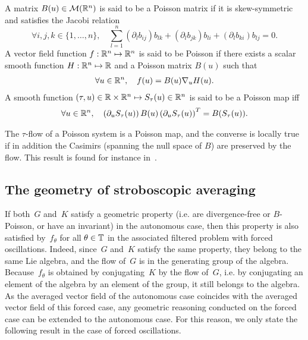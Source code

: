 \begin{definition}
  A matrix $B(u) \in {\cal M}(\mathbb{R}^{n})$ is said to be a Poisson matrix if
  it is skew-symmetric and satisfies the Jacobi relation
  $$
  \forall i,j,k \in \{1,\ldots,n\}, \quad \sum_{l=1}^n (\partial_l b_{ij}) b_{lk} +(\partial_l b_{jk}) b_{li}+(\partial_l b_{ki}) b_{lj} = 0. 
  $$
  A vector field function $f:\mathbb{R}^{n} \mapsto \mathbb{R}^{n}$ is said to be Poisson
  if there exists a scalar smooth function $H:\mathbb{R}^{n} \mapsto \mathbb{R}$ and a
  Poisson matrix $B(u)$ such that 
  \begin{align*}
    \forall u \in \mathbb{R}^{n}, \quad f(u) = B(u) \nabla_u H(u).
  \end{align*}
  A smooth function $(\tau,u) \in \mathbb{R} \times \mathbb{R}^{n} \mapsto  S_\tau(u) \in
  \mathbb{R}^{n}$ is said to be a Poisson map  iff
  \begin{align*}
    \forall u \in \mathbb{R}^{n}, \quad \left(\partial_u S_\tau(u)\right) B(u) \left(\partial_u S_\tau(u)\right)^T = B(S_\tau(u)).
  \end{align*}
\end{definition}

\begin{remark} \label{sec:geometry:rmk:equiv_poisson} The $\tau$-flow of a
  Poisson system is a Poisson map, and the converse is locally
  true if in addition the Casimirs (spanning the null space of $B$) are
  preserved by the flow. This result is found for instance in~\cite[Chap.
  VII, Thm. 4.5]{hairer.2006.geometric}. 
\end{remark}



\subsection{The geometry of stroboscopic averaging}

If both~$G$ and~$K$ satisfy a geometric property (i.e. are
divergence-free or $B$-Poisson, or have an invariant) in the autonomous
case, then this property is also satisfied by~$f_\theta$ for all $\theta
\in \mathbb{T}$ in the associated filtered problem with forced oscillations.
Indeed, since~$G$ and~$K$ satisfy the same property, they belong to the
same Lie algebra, and the flow of~$G$ is in the generating group of the
algebra. Because~$f_\theta$ is obtained by conjugating~$K$ by the flow
of~$G$, i.e. by conjugating an element of the algebra by an element of
the group, it still belongs to the algebra. 
As the averaged vector field
of the autonomous case coincides with the averaged vector field of this
forced case, any geometric reasoning conducted on the forced case can be
extended to the autonomous case. For this reason, we only state the
following result in the case of forced oscillations.


